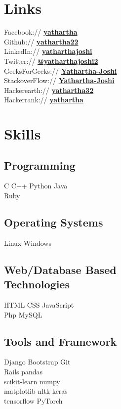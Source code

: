 \documentclass[]{deedy-resume-openfont}
\begin{document}
\begin{minipage}[t]{0.33\textwidth}
\section{Links} 
Facebook:// \href{https://www.facebook.com/yathartha.joshi.399}{\bf yathartha} \\
Github:// \href{https://github.com/Yathartha22}{\bf yathartha22} \\
LinkedIn://  \href{https://www.linkedin.com/in/yathartha-joshi-962701123}{\bf yatharthajoshi} \\
Twitter://  \href{https://twitter.com/yatharthajoshi2}{\bf @yatharthajoshi2} \\
GeeksForGeeks://  \href{https://auth.geeksforgeeks.org/user/YatharthaJoshi/}{\bf Yathartha-Joshi} \\
StackoverFlow://  \href{https://stackoverflow.com/users/6446166/yathartha-joshi}{\bf Yathartha-Joshi} \\
Hackerearth://  \href{https://www.hackerearth.com/@yathartha32}{\bf yathartha32} \\
Hackerrank://  \href{https://www.hackerrank.com/yathartha}{\bf yathartha}


\section{Skills}
\subsection{Programming}
C \textbullet{}   C++ \textbullet{} Python \textbullet{} Java \\
\textbullet{} Ruby
\subsection{Operating Systems}
Linux \textbullet{} Windows
\subsection{Web/Database Based \\ Technologies}
HTML \textbullet{} CSS \textbullet{} JavaScript \\
\textbullet{} Php \textbullet{} MySQL
\subsection{Tools and Framework}
Django \textbullet{} Bootstrap  \textbullet{} Git \\
\textbullet{} Rails \textbullet{} pandas \\
\textbullet{} scikit-learn \textbullet{} numpy \\
\textbullet{} matplotlib \textbullet{} nltk \textbullet{} keras \\
\textbullet{} tensorflow \textbullet{} PyTorch
\sectionsep

%
%

\end{minipage} 
\end{document}
